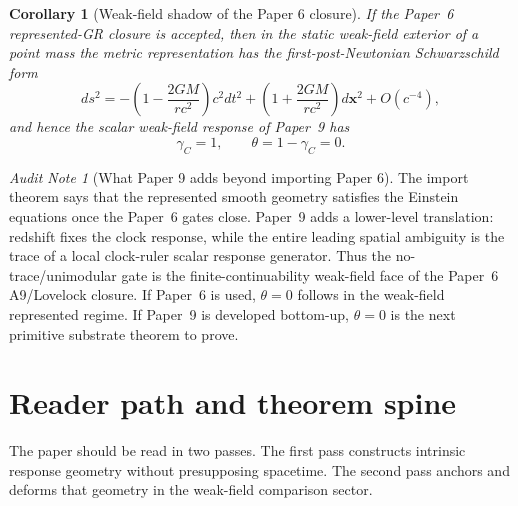 \documentclass[11pt]{article}
\newtheorem{corollary}[theorem]{Corollary}
\theoremstyle{remark}
\newtheorem{audit}[theorem]{Audit Note}
\begin{document}
\begin{corollary}[Weak-field shadow of the Paper 6 closure]
\label{cor:paper6-weak-field-shadow}
If the Paper~6 represented-GR closure is accepted, then in the static weak-field exterior of a point mass the metric representation has the first-post-Newtonian Schwarzschild form
\[
        ds^2
        =-
        \left(1-\frac{2GM}{rc^2}\right)c^2dt^2
        +
        \left(1+\frac{2GM}{rc^2}\right)d\mathbf x^2
        +O(c^{-4}),
\]
and hence the scalar weak-field response of Paper~9 has
\[
        \gamma_C=1,
        \qquad
        \theta=1-\gamma_C=0.
\]
\end{corollary}

\begin{audit}[What Paper 9 adds beyond importing Paper 6]
The import theorem says that the represented smooth geometry satisfies the Einstein equations once the Paper~6 gates close.  Paper~9 adds a lower-level translation: redshift fixes the clock response, while the entire leading spatial ambiguity is the trace of a local clock-ruler scalar response generator.  Thus the no-trace/unimodular gate is the finite-continuability weak-field face of the Paper~6 A9/Lovelock closure.  If Paper~6 is used, \(\theta=0\) follows in the weak-field represented regime.  If Paper~9 is developed bottom-up, \(\theta=0\) is the next primitive substrate theorem to prove.
\end{audit}

\section{Reader path and theorem spine}
\label{sec:reader-path}

The paper should be read in two passes.  The first pass constructs intrinsic response geometry without presupposing spacetime.  The second pass anchors and deforms that geometry in the weak-field comparison sector.
\end{document}
